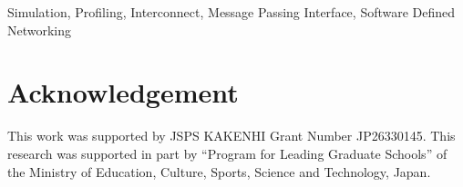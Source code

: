 \documentclass[conference]{IEEEtran}
\begin{document}
\begin{IEEEkeywords}
    Simulation, Profiling, Interconnect, Message Passing Interface, Software
    Defined Networking
\end{IEEEkeywords}








\section*{Acknowledgement}
This work was supported by JSPS KAKENHI Grant Number JP26330145. This research
was supported in part by ``Program for Leading Graduate Schools'' of the
Ministry of Education, Culture, Sports, Science and Technology, Japan.

\printbibliography[heading=bibintoc,title={References}]

\par\leavevmode
\end{document}
